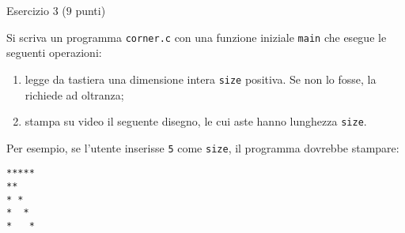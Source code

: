 \documentclass[12pt]{article}
\begin{document}
\vspace*{1ex}
\begin{center}{\Large Esercizio 3} ($9$ punti)\end{center}
Si scriva un programma \texttt{corner.c} con una funzione iniziale \texttt{main}
che esegue le seguenti operazioni:
\begin{enumerate}
\item legge da tastiera una dimensione intera \texttt{size} positiva. Se non lo fosse,
  la richiede ad oltranza;
\item stampa su video il seguente disegno, le cui aste hanno lunghezza \texttt{size}.
\end{enumerate}

Per esempio, se l'utente inserisse \texttt{5} come \texttt{size}, il programma dovrebbe stampare:
%
\begin{verbatim}
*****
**
* *
*  *
*   *
\end{verbatim}
\end{document}
